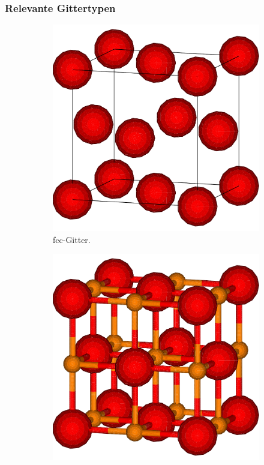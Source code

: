 \subsubsection{Relevante Gittertypen}
\begin{figure}
    \centering
    \begin{subfigure}[t]{0.3\textwidth}
        \centering
        \includegraphics[width=\textwidth]{../assets/theorie/fcc}
        \caption{fcc-Gitter.} \label{fcc}
    \end{subfigure}
    \begin{subfigure}[t]{0.3\textwidth}
        \centering
        \includegraphics[width=\textwidth]{../assets/theorie/rocksalt}

\end{subfigure}
\end{figure}
